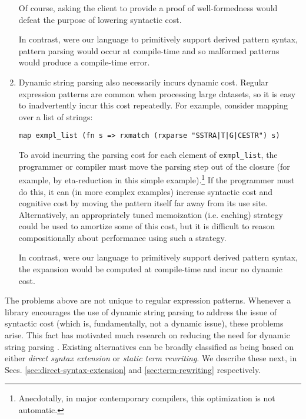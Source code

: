 \begin{enumerate}
Of course, asking the client to provide a proof of well-formedness would defeat the purpose of lowering syntactic cost.

In contrast, were our language to primitively support  derived pattern syntax, pattern parsing would occur at compile-time and so malformed patterns would produce a compile-time error.

\item Dynamic string parsing also necessarily incurs dynamic cost. Regular expression patterns are common when processing large datasets, so it is easy to inadvertently incur this cost repeatedly. For example, consider mapping over a list of strings:
\begin{lstlisting}[numbers=none]
map exmpl_list (fn s => rxmatch (rxparse "SSTRA|T|G|CESTR") s)
\end{lstlisting}
To avoid incurring the parsing cost for each element of \lstinline{exmpl_list}, the programmer or compiler must move the parsing step out of the closure (for example, by eta-reduction in this simple example).\footnote{Anecdotally, in major contemporary compilers, this optimization is not automatic.} If the programmer must do this, it can (in more complex examples) increase syntactic cost and cognitive cost by moving the pattern itself far away from its use site. Alternatively, an appropriately tuned memoization (i.e. caching) strategy could be used to amortize some of this cost, but it is difficult to reason compositionally about performance using such a strategy. %


In contrast, were our language to primitively support derived pattern syntax, the expansion would be computed at compile-time and incur no dynamic cost.
\end{enumerate}

The problems above are not unique to regular expression patterns. Whenever a library encourages the use of dynamic string parsing to address the issue of syntactic cost (which is, fundamentally, not a dynamic issue), these problems arise. %
	This fact has motivated much research on reducing the need for dynamic string parsing \cite{Bravenboer:2007:PIA:1289971.1289975}. Existing alternatives can be broadly classified as being based on either \emph{direct syntax extension} or \emph{static term rewriting}. We describe these next, in Secs. \ref{sec:direct-syntax-extension} and \ref{sec:term-rewriting} respectively.%


